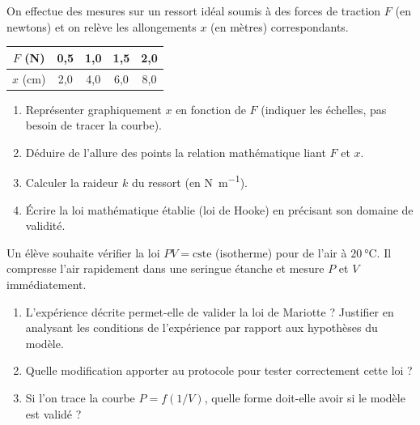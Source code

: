\documentclass[11pt]{article}
\begin{document}
\begin{exercice}
On effectue des mesures sur un ressort idéal soumis à des forces de traction $F$ (en newtons) et on relève les allongements $x$ (en mètres) correspondants.
\begin{center}
\begin{tabular}{|c|c|c|c|c|}
\hline
$F$ (\si{\newton}) & 0,5 & 1,0 & 1,5 & 2,0 \\ \hline
$x$ (\si{\centi\metre}) & 2,0 & 4,0 & 6,0 & 8,0 \\ \hline
\end{tabular}
\end{center}
\begin{enumerate}
    \item Représenter graphiquement $x$ en fonction de $F$ (indiquer les échelles, pas besoin de tracer la courbe).
    \item Déduire de l'allure des points la relation mathématique liant $F$ et $x$.
    \item Calculer la raideur $k$ du ressort (en \si{\newton\per\metre}).
    \item Écrire la loi mathématique établie (loi de Hooke) en précisant son domaine de validité.
\end{enumerate}
\end{exercice}

\begin{exercice}
Un élève souhaite vérifier la loi $P V = \text{cste}$ (isotherme) pour de l'air à $\SI{20}{\celsius}$. Il compresse l'air rapidement dans une seringue étanche et mesure $P$ et $V$ immédiatement.
\begin{enumerate}
    \item L'expérience décrite permet-elle de valider la loi de Mariotte ? Justifier en analysant les conditions de l'expérience par rapport aux hypothèses du modèle.
    \item Quelle modification apporter au protocole pour tester correctement cette loi ?
    \item Si l'on trace la courbe $P = f(1/V)$, quelle forme doit-elle avoir si le modèle est validé ?
\end{enumerate}
\end{exercice}
\end{document}
